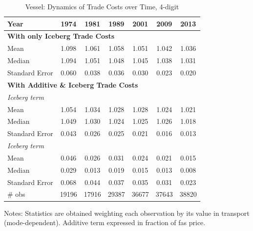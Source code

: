\documentclass[a4paper,11pt]{article}
\begin{document}
\begin{table}[htbp]
  \centering
\caption{Vessel: Dynamics of Trade Costs over Time, 4-digit}
\begin{center}
    \begin{tabular}{l|cccccc}
   \hline\hline
Year & 1974  & 1981  & 1989  & 2001  & 2009  & 2013 \\
\hline
\multicolumn{7}{l}{\textbf{With only Iceberg Trade Costs}} \\
Mean  & 1.098 & 1.061 & \multicolumn{1}{c}{1.058} & \multicolumn{1}{c}{1.051} & \multicolumn{1}{c}{1.042} & \multicolumn{1}{c}{1.036}  \\
Median & 1.094 & 1.051 & \multicolumn{1}{c}{1.048} & \multicolumn{1}{c}{1.045} & \multicolumn{1}{c}{1.038} & \multicolumn{1}{c}{1.031} \\
Standard Error & 0.060 & 0.038 & \multicolumn{1}{c}{0.036} & \multicolumn{1}{c}{0.030} & \multicolumn{1}{c}{0.023} & \multicolumn{1}{c}{0.020} \\
\hline
\multicolumn{7}{l}{\textbf{With Additive \& Iceberg Trade Costs } }\\ \hline
\textit{Iceberg term} &       &       &       &       &       &     \\
Mean  & 1.054 & 1.034 & \multicolumn{1}{c}{1.028} & \multicolumn{1}{c}{1.028} & \multicolumn{1}{c}{1.024} & \multicolumn{1}{c}{1.021}  \\
Median & 1.049 & 1.030 & \multicolumn{1}{c}{1.024} & \multicolumn{1}{c}{1.025} & \multicolumn{1}{c}{1.026} & \multicolumn{1}{c}{1.018} \\
Standard Error & 0.043 & 0.026 & \multicolumn{1}{c}{0.025} & \multicolumn{1}{c}{0.021} & \multicolumn{1}{c}{0.016} & \multicolumn{1}{c}{0.013}  \\
\textit{Iceberg term} &       &       &       &       &       &     \\
Mean  & 0.046 & 0.026 & \multicolumn{1}{c}{0.031} & \multicolumn{1}{c}{0.024} & \multicolumn{1}{c}{0.021} & \multicolumn{1}{c}{0.015}  \\
Median & 0.029 & 0.013 & \multicolumn{1}{c}{0.019} & \multicolumn{1}{c}{0.015} & \multicolumn{1}{c}{0.013} & \multicolumn{1}{c}{0.008} \\
Standard Error & 0.068 & 0.044 & \multicolumn{1}{c}{0.037} & \multicolumn{1}{c}{0.035} & \multicolumn{1}{c}{0.031} & \multicolumn{1}{c}{0.023} \\ \hline
\# obs & 19196 & 17916 & \multicolumn{1}{c}{29387} & \multicolumn{1}{c}{36677} & \multicolumn{1}{c}{37643} & \multicolumn{1}{c}{38820} \\
\hline\hline
    \end{tabular}%
  \end{center}
  \label{tab:result_ves_rob}%
\vspace{-10pt}\tiny{Notes: Statistics are obtained weighting each observation by its value in transport (mode-dependent). Additive term expressed in fraction of fas price. }
\end{table}%
\end{document}
